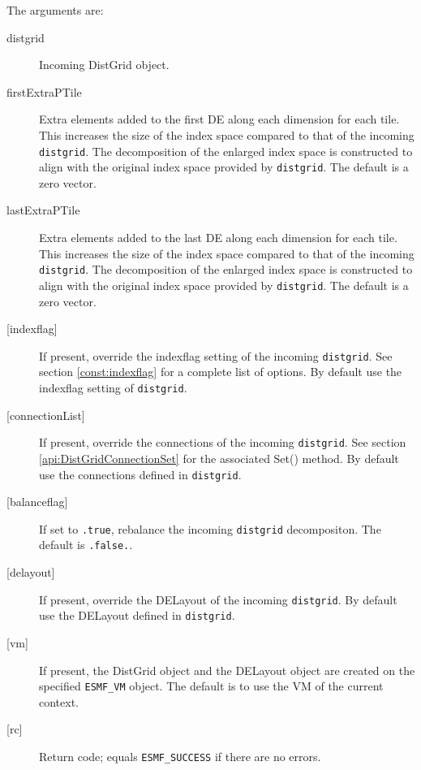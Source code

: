        The arguments are:
       \begin{description}
       \item[distgrid]
            Incoming DistGrid object.
       \item[firstExtraPTile]
            Extra elements added to the first DE along each dimension for each 
            tile. This increases the size of the index space compared to 
            that of the incoming {\tt distgrid}. The decomposition of the
            enlarged index space is constructed to align with the original index
            space provided by {\tt distgrid}.
            The default is a zero vector.
       \item[lastExtraPTile]
            Extra elements added to the last DE along each dimension for each
            tile. This increases the size of the index space compared to 
            that of the incoming {\tt distgrid}. The decomposition of the
            enlarged index space is constructed to align with the original index
            space provided by {\tt distgrid}.
            The default is a zero vector.
       \item[{[indexflag]}]
            If present, override the indexflag setting of the incoming
            {\tt distgrid}. See section \ref{const:indexflag} for a 
            complete list of options. By default use the indexflag setting of 
            {\tt distgrid}. 
       \item[{[connectionList]}]
            If present, override the connections of the incoming {\tt distgrid}.
            See section \ref{api:DistGridConnectionSet} for the associated Set()
            method. By default use the connections defined in {\tt distgrid}.
       \item[{[balanceflag]}]
            If set to {\tt .true}, rebalance the incoming {\tt distgrid}
            decompositon. The default is {\tt .false.}.
       \item[{[delayout]}]
            If present, override the DELayout of the incoming {\tt distgrid}.
            By default use the DELayout defined in {\tt distgrid}.
       \item[{[vm]}]
            If present, the DistGrid object and the DELayout object
            are created on the specified {\tt ESMF\_VM} object. The 
            default is to use the VM of the current context. 
       \item[{[rc]}]
            Return code; equals {\tt ESMF\_SUCCESS} if there are no errors.
       \end{description}
   
